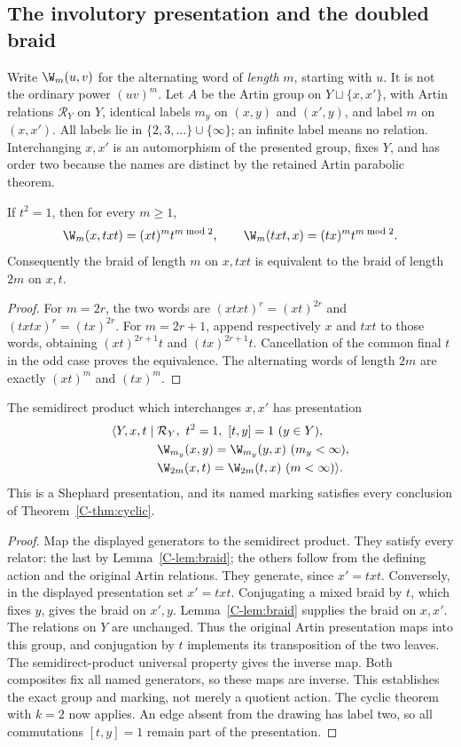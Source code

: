 \subsection{The involutory presentation and the doubled braid}
Write $\W_m(u,v)$ for the alternating word of \emph{length} $m$,
starting with $u$. It is not the ordinary power $(uv)^m$.
Let $A$ be the Artin group on $Y\sqcup\{x,x'\}$, with Artin
relations $\mathcal R_Y$ on $Y$, identical labels $m_y$ on
$(x,y)$ and $(x',y)$, and label $m$ on $(x,x')$.
All labels lie in $\{2,3,\ldots\}\cup\{\infty\}$; an infinite
label means no relation. Interchanging $x,x'$ is an automorphism of
the presented group, fixes $Y$, and has order two because the names
are distinct by the retained Artin parabolic theorem.

\begin{lemma}\label{C-lem:braid}
If $t^2=1$, then for every $m\geq1$,
\[
 \W_m(x,txt)=(xt)^m t^{m\bmod2},\qquad
 \W_m(txt,x)=(tx)^m t^{m\bmod2}.
\]
Consequently the braid of length $m$ on $x,txt$ is equivalent to the
braid of length $2m$ on $x,t$.
\end{lemma}
\begin{proof}
For $m=2r$, the two words are $(xtxt)^r=(xt)^{2r}$ and
$(txtx)^r=(tx)^{2r}$. For $m=2r+1$, append respectively $x$ and
$txt$ to those words, obtaining $(xt)^{2r+1}t$ and
$(tx)^{2r+1}t$. Cancellation of the common final $t$ in the odd case
proves the equivalence. The alternating words of length $2m$ are
exactly $(xt)^m$ and $(tx)^m$.
\end{proof}

\begin{theorem}\label{C-thm:fold}
The semidirect product which interchanges $x,x'$ has presentation
\begin{align*}
 \langle Y,x,t\mid {}&\mathcal R_Y,\ t^2=1,\ [t,y]=1\ (y\in Y),\\
 &\W_{m_y}(x,y)=\W_{m_y}(y,x)\ (m_y<\infty),\\
 &\W_{2m}(x,t)=\W_{2m}(t,x)\ (m<\infty)\rangle.
\end{align*}
This is a Shephard presentation, and its named marking satisfies every
conclusion of Theorem~\ref{C-thm:cyclic}.
\end{theorem}
\begin{proof}
Map the displayed generators to the semidirect product. They satisfy
every relator: the last by Lemma~\ref{C-lem:braid}; the others follow
from the defining action and the original Artin relations. They generate,
since $x'=txt$. Conversely, in the displayed presentation set
$x'=txt$. Conjugating a mixed braid by $t$, which fixes $y$, gives
the braid on $x',y$. Lemma~\ref{C-lem:braid} supplies the braid on
$x,x'$. The relations on $Y$ are unchanged. Thus the original Artin
presentation maps into this group, and conjugation by $t$ implements
its transposition of the two leaves. The semidirect-product universal
property gives the inverse map. Both composites fix all named
 generators, so these maps are inverse. This establishes the exact
 group and marking, not merely a quotient action. The cyclic theorem
with $k=2$ now applies. An edge absent from the drawing has label two,
so all commutations $[t,y]=1$ remain part of the presentation.
\end{proof}

